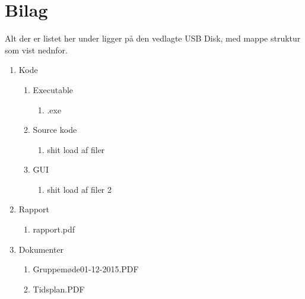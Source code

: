 \appendix
\section{Bilag} \hfill
Alt der er listet her under ligger på den vedlagte USB Disk, med mappe struktur som vist nednfor.

\begin{enumerate}[noitemsep]
	\item Kode
	\begin{enumerate}[noitemsep]
		\item Executable
		\begin{enumerate}[noitemsep]
			\item .exe
		\end{enumerate}
		\item Source kode
		\begin{enumerate}[noitemsep]
			\item shit load af filer
		\end{enumerate}
		\item GUI
		\begin{enumerate}[noitemsep]
			\item shit load af filer 2
		\end{enumerate}
	\end{enumerate}
	\item Rapport
	\begin{enumerate}[noitemsep]
		\item rapport.pdf
	\end{enumerate}
	\item Dokumenter
	\begin{enumerate}[noitemsep]
		\item Gruppemøde01-12-2015.PDF \label{itm:Modereferat1}
		\item Tidsplan.PDF \label{itm:Tidsplan1}
	\end{enumerate}
\end{enumerate}